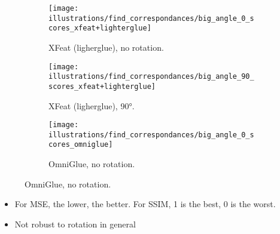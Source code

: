 \documentclass[aspectratio=169,hyperref={pdfpagelabels=false}]{beamer}
\begin{document}
    \begin{frame}
        \begin{figure}[ht!]
            \centering
            \begin{subfigure}[t]{0.32\textwidth}
                \texttt{[image: illustrations/find\_correspondances/big\_angle\_0\_scores\_xfeat+lighterglue]}
                \caption{XFeat (ligherglue), no rotation.}
                \label{fig:find_corr:big_angles:mse_ssim_xfeat+lg_0}
            \end{subfigure}
            \hfill
            \begin{subfigure}[t]{0.32\textwidth}
                \texttt{[image: illustrations/find\_correspondances/big\_angle\_90\_scores\_xfeat+lighterglue]}
                \caption{XFeat (ligherglue), 90°.}
                \label{fig:find_corr:big_angles:mse_ssim_xfeat+lg_90}
            \end{subfigure}
            \hfill
            \begin{subfigure}[t]{0.32\textwidth}
                \texttt{[image: illustrations/find\_correspondances/big\_angle\_0\_scores\_omniglue]}
                \caption{OmniGlue, no rotation.}
                \label{fig:find_corr:big_angles:mse_ssim_omniglue_0}
            \end{subfigure}
        \end{figure}
        \begin{itemize}
            \item For MSE, the lower, the better. For SSIM, 1 is the best, 0 is the worst.
            \item Not robust to rotation in general
        \end{itemize}
    \end{frame}
\end{document}
